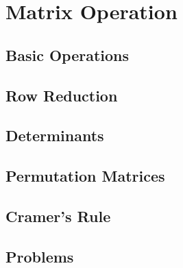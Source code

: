 \chapter{Matrix Operation}
\section{Basic Operations}
\section{Row Reduction}
\section{Determinants}
\section{Permutation Matrices}
\section{Cramer's Rule}
\section{Problems}